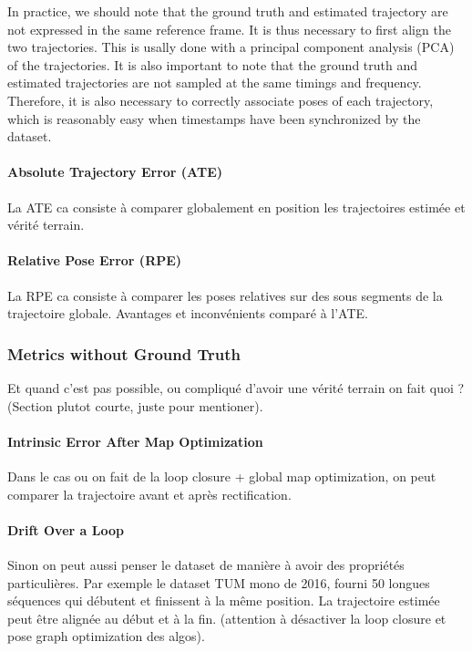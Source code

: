 In practice, we should note that the ground truth and estimated trajectory
are not expressed in the same reference frame.
It is thus necessary to first align the two trajectories.
This is usally done with a principal component analysis (PCA)
of the trajectories.
It is also important to note that the ground truth and estimated trajectories
are not sampled at the same timings and frequency.
Therefore, it is also necessary to correctly associate poses of each trajectory,
which is reasonably easy when timestamps have been synchronized by the dataset.


\paragraph{Absolute Trajectory Error (ATE)}%
\label{par:ate}

La ATE ca consiste à comparer globalement en position les trajectoires
estimée et vérité terrain.

\paragraph{Relative Pose Error (RPE)}%
\label{par:rpe}

La RPE ca consiste à comparer les poses relatives sur des sous segments
de la trajectoire globale.
Avantages et inconvénients comparé à l'ATE.

\subsubsection{Metrics without Ground Truth}%
\label{ssub:metrics_no_gt}

Et quand c'est pas possible, ou compliqué d'avoir une vérité terrain
on fait quoi ? (Section plutot courte, juste pour mentioner).

\paragraph{Intrinsic Error After Map Optimization}%
\label{par:map_optim}

Dans le cas ou on fait de la loop closure + global map optimization,
on peut comparer la trajectoire avant et après rectification.

\paragraph{Drift Over a Loop}%
\label{par:drift_loop}

Sinon on peut aussi penser le dataset de manière à avoir des propriétés particulières.
Par exemple le dataset TUM mono de 2016, fourni 50 longues séquences qui débutent
et finissent à la même position.
La trajectoire estimée peut être alignée au début et à la fin.
(attention à désactiver la loop closure et pose graph optimization des algos).

